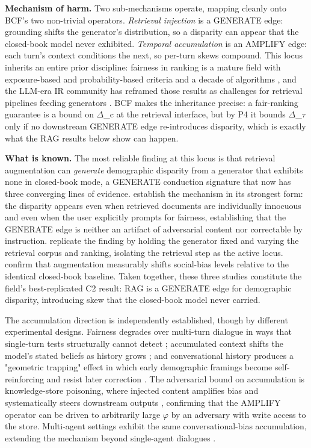 \documentclass[10pt]{article}
\begin{document}
\textbf{Mechanism of harm.} Two sub-mechanisms operate, mapping cleanly onto BCF's two non-trivial operators. \emph{Retrieval injection} is a GENERATE edge: grounding shifts the generator's distribution, so a disparity can appear that the closed-book model never exhibited. \emph{Temporal accumulation} is an AMPLIFY edge: each turn's context conditions the next, so per-turn skews compound. This locus inherits an entire prior discipline: fairness in ranking is a mature field with exposure-based and probability-based criteria and a decade of algorithms \cite{zehlike2022fairness}, and the LLM-era IR community has reframed those results as challenges for retrieval pipelines feeding generators \cite{dai2024bias,dai2025trustworthy}. BCF makes the inheritance precise: a fair-ranking guarantee is a bound on $\Delta$\_c at the retrieval interface, but by P4 it bounds $\Delta$\_$\tau$ only if no downstream GENERATE edge re-introduces disparity, which is exactly what the RAG results below show can happen.

\textbf{What is known.} The most reliable finding at this locus is that retrieval augmentation can \emph{generate} demographic disparity from a generator that exhibits none in closed-book mode, a GENERATE conduction signature that now has three converging lines of evidence. \cite{hu2024free} establish the mechanism in its strongest form: the disparity appears even when retrieved documents are individually innocuous and even when the user explicitly prompts for fairness, establishing that the GENERATE edge is neither an artifact of adversarial content nor correctable by instruction. \cite{wu2024rag} replicate the finding by holding the generator fixed and varying the retrieval corpus and ranking, isolating the retrieval step as the active locus. \cite{zhang2025evaluating} confirm that augmentation measurably shifts social-bias levels relative to the identical closed-book baseline. Taken together, these three studies constitute the field's best-replicated C2 result: RAG is a GENERATE edge for demographic disparity, introducing skew that the closed-book model never carried.

The accumulation direction is independently established, though by different experimental designs. Fairness degrades over multi-turn dialogue in ways that single-turn tests structurally cannot detect \cite{fan2024fairmt}; accumulated context shifts the model's stated beliefs as history grows \cite{geng2025accumulating}; and conversational history produces a "geometric trapping" effect in which early demographic framings become self-reinforcing and resist later correction \cite{simhi2026old}. The adversarial bound on accumulation is knowledge-store poisoning, where injected content amplifies bias and systematically steers downstream outputs \cite{wang2025bias}, confirming that the AMPLIFY operator can be driven to arbitrarily large $\varphi$ by an adversary with write access to the store. Multi-agent settings exhibit the same conversational-bias accumulation, extending the mechanism beyond single-agent dialogues \cite{coppolillo2025unmasking}.
\end{document}
